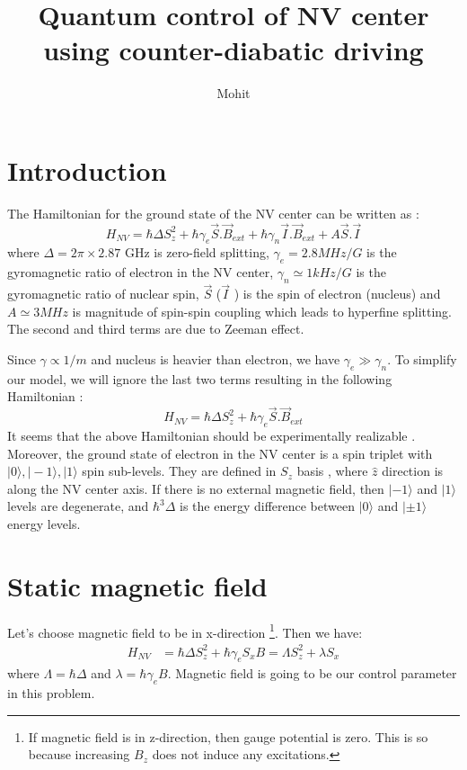 \documentclass[11pt,a4paper]{article}
\author{Mohit}
\title{Quantum control of NV center using counter-diabatic driving  }
\begin{document}
\maketitle

\section{Introduction}
 The Hamiltonian for the ground state of the NV center can be written as :
\begin{equation}
H_{NV}= \hbar \Delta S_z^2 + \hbar \gamma_e \vec{S}. \vec{B}_{ext} +  \hbar \gamma_n \vec{I}. \vec{B}_{ext} + A \vec{S}. \vec{I}
\end{equation}
where $\Delta= 2 \pi \times 2.87 $ GHz is zero-field splitting, $\gamma_e =2.8 MHz/G$ is the gyromagnetic ratio of electron in the NV center, $\gamma_n \simeq 1 kHz/G$ is the gyromagnetic ratio of nuclear spin, $\vec{S}$ ($\vec{I}$ ) is the spin of electron (nucleus) and $A \simeq 3 MHz$ is magnitude of spin-spin coupling which leads to hyperfine splitting. The second and third terms are due to Zeeman effect.

Since $\gamma \propto 1/m$ and nucleus is heavier than electron, we have $\gamma_e \gg \gamma_n$. To simplify our model, we will ignore the last two terms resulting in the following Hamiltonian :
\begin{equation}
H_{NV}= \hbar \Delta S_z^2 + \hbar \gamma_e \vec{S}. \vec{B}_{ext} 
\end{equation}
It seems that the above Hamiltonian should be experimentally realizable \cite{dhingra2017nitrogen}. Moreover, the ground state of electron in the NV center is a spin triplet with $| 0 \rangle, | -1 \rangle, | 1 \rangle$ spin sub-levels. They are defined in $S_z$ basis , where $\hat{z}$ direction is along the NV center axis. If there is no external magnetic field, then $| -1 \rangle$ and $| 1 \rangle$ levels are degenerate, and  $ \hbar^3 \Delta$ is the energy difference between $| 0 \rangle$ and $| \pm 1 \rangle$ energy levels.

\section{Static magnetic field}

Let's choose magnetic field to be in x-direction \footnote{If magnetic field is in z-direction, then gauge potential is zero. This is so because increasing $B_z$ does not induce any excitations. }. Then we have:
\begin{align*}
H_{NV} &= \hbar \Delta S_z^2 + \hbar \gamma_e   S_x  B = \Lambda S_z^2 + \lambda   S_x  
\end{align*}
where $\Lambda= \hbar \Delta $ and $\lambda=\hbar \gamma_e B $. Magnetic field is going to be our control parameter in this problem. 
\end{document}
